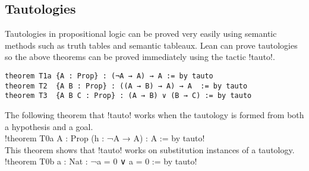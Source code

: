 \subsection{Tautologies}

Tautologies in propositional logic can be proved very easily using semantic methods such as truth tables and semantic tableaux. Lean can prove tautologies so the above theorems can be proved immediately using the tactic !tauto!.

\begin{Verbatim}[numbers=none]
theorem T1a {A : Prop} : (¬A → A) → A := by tauto
theorem T2  {A B : Prop} : ((A → B) → A) → A  := by tauto
theorem T3  {A B C : Prop} : (A → B) ∨ (B → C) := by tauto
\end{Verbatim}
The following theorem that !tauto! works when the tautology is formed from both a hypothesis and a goal.\\
!theorem T0a {A : Prop} (h : ¬A → A) : A := by tauto!\\
This theorem shows that !tauto! works on substitution instances of a tautology.\\
!theorem T0b {a : Nat} : ¬a = 0 ∨ a = 0 := by tauto!
